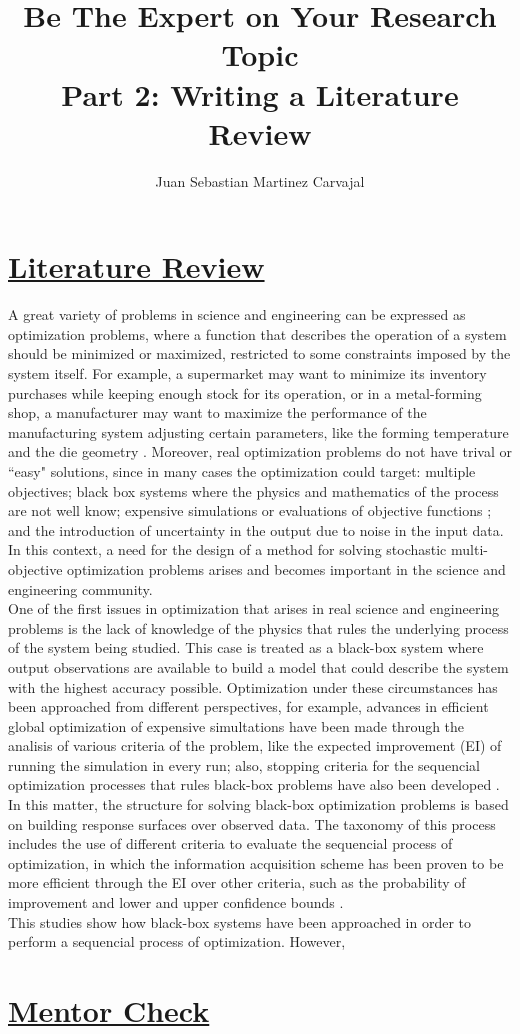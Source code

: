 \documentclass{journal}
\title{\textbf{Be The Expert on Your Research Topic}\\Part 2: Writing a Literature Review}
\author{Juan Sebastian Martinez Carvajal}
\date{}
\begin{document}
\maketitle
\hrulefill

\section{\underline{Literature Review}}

A great variety of problems in science and engineering can be expressed as optimization problems, where a function that describes the operation of a system should be minimized or maximized, restricted to some constraints imposed by the system itself. For example, a supermarket may want to minimize its inventory purchases while keeping enough stock for its operation, or in a metal-forming shop, a manufacturer may want to maximize the performance of the manufacturing system adjusting certain parameters, like the forming temperature and the die geometry \cite{Huang2006}. Moreover, real optimization problems do not have trival or ``easy" solutions, since in many cases the optimization could target: multiple objectives; black box systems where the physics and mathematics of the process are not well know; expensive simulations or evaluations of objective functions \cite{Jones1998}; and the introduction of uncertainty in the output due to noise in the input data. In this context, a need for the design of a method for solving stochastic multi-objective optimization problems arises and becomes important in the science and engineering community.\\

One of the first issues in optimization that arises in real science and engineering problems is the lack of knowledge of the physics that rules the underlying process of the system being studied. This case is treated as a black-box system where output observations are available to build a model that could describe the system with the highest accuracy possible. Optimization under these circumstances has been approached from different perspectives, for example, advances in efficient global optimization of expensive simultations have been made through the analisis of various criteria of the problem, like the expected improvement (EI) of running the simulation in every run; also, stopping criteria for the sequencial optimization processes that rules black-box problems have also been developed \cite{Jones1998}. In this matter, the structure for solving black-box optimization problems is based on building response surfaces over observed data. The taxonomy of this process includes the use of different criteria to evaluate the sequencial process of optimization, in which the information acquisition scheme has been proven to be more efficient through the EI over other criteria, such as the probability of improvement and lower and upper confidence bounds \cite{Jones2001}.\\

This studies show how black-box systems have been approached in order to perform a sequencial process of optimization. However, 

\section{\underline{Mentor Check}}



\end{document}
